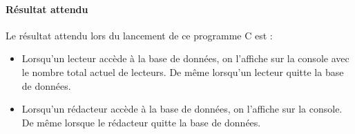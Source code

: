 \documentclass[12pt]{article}
\begin{document}
  \paragraph{Résultat attendu\\}
  Le résultat attendu lors du lancement de ce programme C est :
  \begin{itemize}
    \item Lorsqu'un lecteur accède à la base de données, on l'affiche sur la console avec le nombre total actuel de lecteurs. De même lorsqu'un lecteur quitte la base de données.
    \item Lorsqu'un rédacteur accède à la base de données, on l'affiche sur la console. De même lorsque le rédacteur quitte la base de données.
  \end{itemize}
\end{document}
